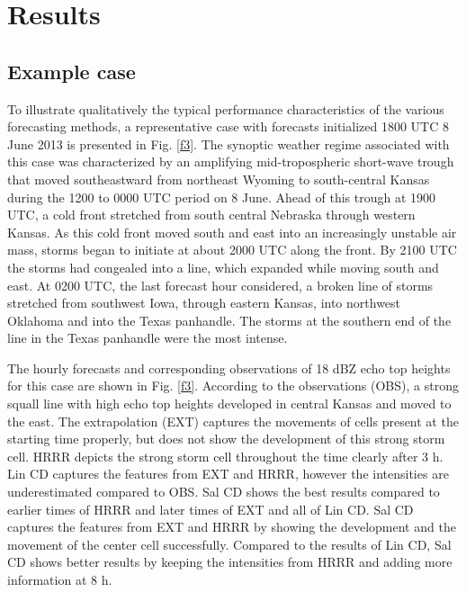 \documentclass[12pt]{article}
\begin{document}
\section{Results}
\subsection{Example case}
To illustrate qualitatively the typical performance characteristics of the various forecasting methods, a representative case with forecasts initialized 1800 UTC 8 June 2013 is presented in Fig. \ref{f3}.  The synoptic weather regime associated with this case was characterized by an amplifying mid-tropospheric short-wave trough that moved southeastward from northeast Wyoming to south-central Kansas during the 1200 to 0000 UTC period on 8 June.  Ahead of this trough at 1900 UTC, a cold front stretched from south central Nebraska through western Kansas.  As this cold front moved south and east into an increasingly unstable air mass, storms began to initiate at about 2000 UTC along the front.  By 2100 UTC the storms had congealed into a line, which expanded while moving south and east.  At 0200 UTC, the last forecast hour considered, a broken line of storms stretched from southwest Iowa, through eastern Kansas, into northwest Oklahoma and into the Texas panhandle.  The storms at the southern end of the line in the Texas panhandle were the most intense.  

The hourly forecasts and corresponding observations of 18 dBZ echo top heights for this case are shown in Fig. \ref{f3}. According to the observations (OBS), a strong squall line with high echo top heights developed in central Kansas and moved to the east. The extrapolation (EXT) captures the movements of cells present at the starting time properly, but does not show the development of this strong storm cell. HRRR depicts the strong storm cell throughout the time clearly after 3 h. Lin CD captures the features from EXT and HRRR, however the intensities are underestimated compared to OBS. Sal CD shows the best results compared to earlier times of HRRR and later times of EXT and all of Lin CD. Sal CD captures the features from EXT and HRRR by showing the development and the movement of the center cell successfully. Compared to the results of Lin CD, Sal CD shows better results by keeping the intensities from HRRR and adding more information at 8 h.  
\end{document}
